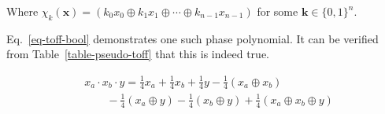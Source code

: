 Where $\chi_k(\mathbf{x}) = ( k_0 x_0 \oplus k_1 x_1 \oplus \cdots \oplus k_{n-1} x_{n-1})$ for some
$\mathbf{k} \in \{0,1\}^{n}$.

Eq.~\ref{eq-toff-bool} demonstrates one such phase polynomial. It can be verified from Table~\ref{table-pseudo-toff} that
this is indeed true.

\begin{equation}
  \label{eq-toff-bool}
  \begin{aligned}
    &x_a \cdot x_b \cdot y = \frac{1}{4}x_a + \frac{1}{4}x_b + \frac{1}{4}y - \frac{1}{4}(x_a \oplus x_b) \\
    &\qquad -\frac{1}{4}(x_a \oplus y) - \frac{1}{4}(x_b \oplus y) + \frac{1}{4}(x_a \oplus x_b \oplus y)
  \end{aligned}
\end{equation}

